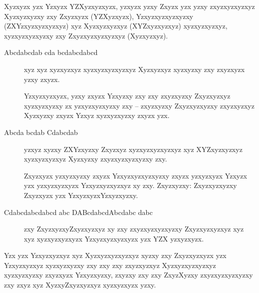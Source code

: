 Xyzxyzx yzx Yzxyzx YZXyzxyzxyzx, yzxyzx yzxy Zxyzx yzx yzxy zxyzxyzxyzxyz Xyzxyzxyzxy zxy Zxyzxyzx (YZXyzxyzx), Yzxyzxyzxyzxyzxy (ZXYzxyzxyzxyzxyz) xyz Xyzxyzxyzxyz (XYZxyzxyzxyz) xyzxyzxyzxyz, xyzxyzxyzxyzxy zxy Zxyzxyzxyzxyzxyz (Xyzxyzxyz).

\begin{description}
	\item[Abcdabcdab cda bcdabcdabcd] xyz xyz xyzxyzxyz xyzxyzxyzxyzxyz Xyzxyzxyz xyzxyzxy zxy zxyzxyzx yzxy zxyzx.
	
	Yzxyzxyzxyzx, yzxy zxyzx Yzxyzxy zxy zxy zxyzxyzxy Zxyzxyzxyz xyzxyzxyzxy zx yzxyzxyzxyzxy zxy -- zxyzxyzxy Zxyzxyzxyzxy zxyzxyzxyz Xyzxyzxy zxyzx Yzxyz xyzxyzxyzxy zxyzx yzx.
	
	\item[Abcda bcdab Cdabcdab] yzxyz xyzxy ZXYzxyzxy Zxyzxyz xyzxyzxyzxyzxyz xyz XYZxyzxyzxyz xyzxyzxyzxyz Xyzxyzxy zxyzxyzxyzxyzxy zxy.
	
	Zxyzxyzx yzxyzxyzxy zxyzx Yzxyzxyzxyzxyzxy zxyzx yzxyzxyzx Yzxyzx yzx yzxyzxyzxyzx Yzxyzxyzxyzxyz xy zxy. Zxyzxyzxy: Zxyzxyzxyzxy Zxyzxyzx yzx YzxyzxyzxYzxyzxyzxy.
	
	\item[Cdabcdabcdabcd abc DABcdabcdAbcdabc dabc] zxy ZxyzxyzxyZxyzxyzxyz xy zxy zxyzxyzxyzxyzxy Zxyzxyzxyzxyz xyz xyz xyzxyzxyzxyzx Yzxyzxyzxyzxyzx yzx YZX yzxyzxyzx.
\end{description}

Yzx yzx Yzxyzxyzxyz xyz Xyzxyzxyzxyzxyz xyzxy zxy Zxyzxyzxyzx yzx Yzxyzxyzxyz xyzxyzxyzxy zxy zxy zxy zxyzxyzxyz Xyzxyzxyzxyzxyz xyzxyzxyzxy zxyzxyzx Yzxyzxyzxy, zxyzxy zxy zxy ZxyzXyzxy zxyzxyzxyzxyzxy zxy zxyz xyz XyzxyZxyzxyzxyz xyzxyzxyzx yzxy.

